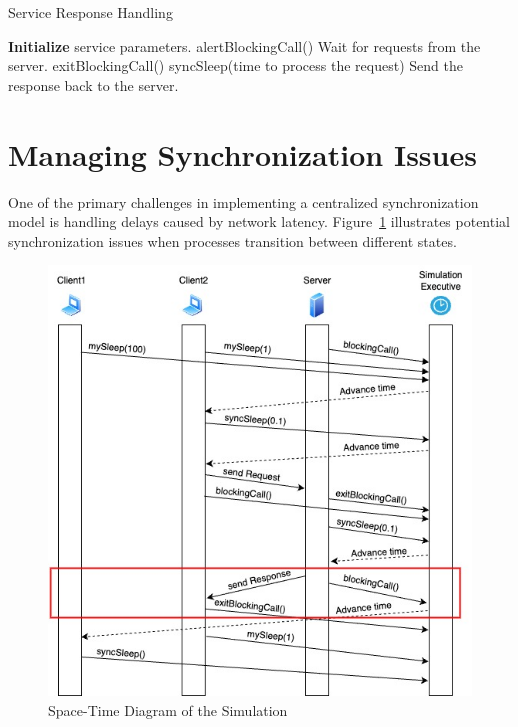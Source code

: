 \begin{algorithm}[H]
\caption{Service Response Handling} \label{alg:service_response_handling}
\begin{algorithmic}[1]
    \STATE \textbf{Initialize} service parameters.
        \STATE alertBlockingCall()
        \STATE Wait for requests from the server.
        \STATE exitBlockingCall()
        \STATE syncSleep(time to process the request)
        \STATE Send the response back to the server.
    \ENDWHILE
\end{algorithmic}
\end{algorithm}

\section{Managing Synchronization Issues}

One of the primary challenges in implementing a centralized synchronization model is handling delays caused by network latency. Figure~\ref{fig:IssueImp} illustrates potential synchronization issues when processes transition between different states.

\begin{figure}[H]
    \centering
    \includegraphics[width=1\linewidth]{images/IssueImp.jpg}
    \caption{Space-Time Diagram of the Simulation}
    \label{fig:IssueImp}
\end{figure}

